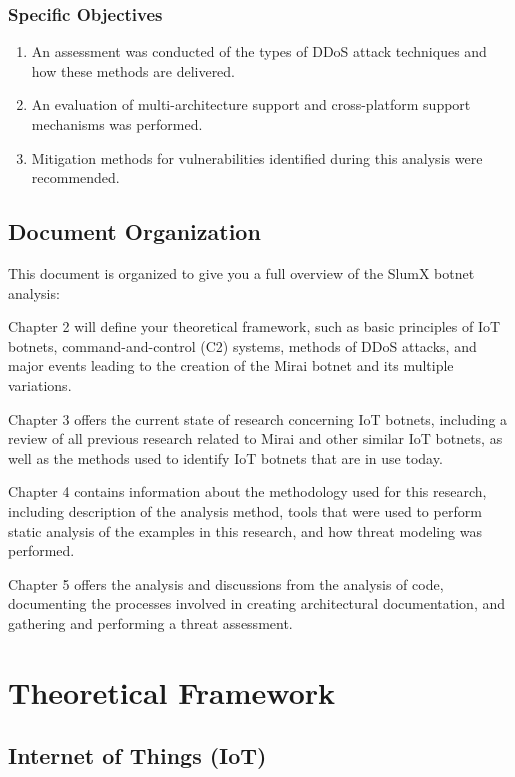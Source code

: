 \documentclass[12pt,letterpaper]{report}
\begin{document}
\subsection{Specific Objectives}

\begin{enumerate}
    \item An assessment was conducted of the types of DDoS attack techniques and how these methods are delivered.
    \item An evaluation of multi-architecture support and cross-platform support mechanisms was performed.
    \item Mitigation methods for vulnerabilities identified during this analysis were recommended.
\end{enumerate}

\section{Document Organization}

This document is organized to give you a full overview of the SlumX botnet analysis:

Chapter 2 will define your theoretical framework, such as basic principles of IoT botnets, command-and-control (C2) systems, methods of DDoS attacks, and major events leading to the creation of the Mirai botnet and its multiple variations.

Chapter 3 offers the current state of research concerning IoT botnets, including a review of all previous research related to Mirai and other similar IoT botnets, as well as the methods used to identify IoT botnets that are in use today.

Chapter 4 contains information about the methodology used for this research, including description of the analysis method, tools that were used to perform static analysis of the examples in this research, and how threat modeling was performed.

Chapter 5 offers the analysis and discussions from the analysis of code, documenting the processes involved in creating architectural documentation, and gathering and performing a threat assessment.

\chapter{Theoretical Framework}

\section{Internet of Things (IoT)}
\end{document}
